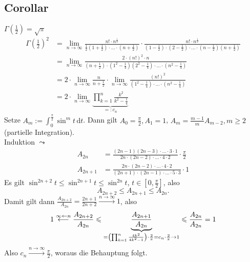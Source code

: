 \subsection[Corollar: $\Gamma(1/2) = \sqrt{\pi}$]{Corollar} %
\label{sub:79}
$\Gamma(\frac{1}{2} ) = \sqrt{\pi }  $
\begin{align*}
	\Gamma(\frac{1}{2} )^2 &= \lim_{ n \to \infty} \frac{n! \cdot n^{\frac{1}{2} }}{\frac{1}{2}(1+ \frac{1}{2} ) \cdot \ldots \cdot (n+ \frac{1}{2} ) } \cdot 
	\frac{n! \cdot n^{\frac{1}{2}} }{(1-\frac{1}{2} ) \cdot (2-\frac{1}{2} ) \cdot \ldots \cdot (n- \frac{1}{2} ) (n+\frac{1}{2} )}  \\
	&= \lim_{ n \to \infty} \frac{2 \cdot  (n!)^2 \cdot n}{(n+\frac{1}{2} ) \cdot (1^2- \frac{1}{4} ) (2^2 - \frac{1}{4} ) \cdot \ldots \cdot (n^2- \frac{1}{4} )} \\
	&= 2 \cdot \lim_{ n \to \infty}  \frac{n}{n+\frac{1}{2} } \cdot \lim_{ n \to \infty} \frac{(n!)^2}{(1^2 - \frac{1}{4} ) \cdot \ldots \cdot (n^2- \frac{1}{4} )} \\
	&= 2 \cdot \lim_{ n \to \infty} \underbrace{\prod_{k=1}^{n} \frac{k^2}{k^2- \frac{1}{4} } }_{=: c_n}
\end{align*}
Setze $A_m := \int_{0} ^{\frac{\pi }{2} } \! \sin^m t  \, \mathrm{d}t$. Dann gilt $A_0 = \frac{\pi }{2}, A_1 =1 $, $A_m = \frac{m-1}{m} A_{m-2}, m \ge 2 $ 
(partielle Integration). \\
Induktion $\leadsto$
\begin{align*}
	A_{2n} &= \frac{(2n-1) (2n-3) \cdot \ldots \cdot 3 \cdot 1}{2n \cdot (2n-2) \cdot \ldots \cdot 4 \cdot 2} \cdot \frac{\pi}{2} \\
	A_{2n+1} &= \frac{2n \cdot (2n-2) \cdot \ldots \cdot 4 \cdot 2}{(2n+1) \cdot (2n-1) \cdot \ldots \cdot 5 \cdot 3} \cdot 1 
\end{align*}
Es gilt $\sin^{2n+2}t \le \sin^{2n+1} t \le \sin^{2n} t $, $t \in [0, \frac{\pi}{2}]$, also
\[
	A_{2n+2} \le A_{2n+1} \le A_{2n}.
\]
Damit gilt dann $\frac{A_{2n+2}}{A_{2n}} = \frac{2n+1}{2n+2} \xrightarrow{n \to \infty} 1  $, also
\begin{align*}
	1\overset{\infty \leftarrow n}{\longleftarrow} \frac{A_{2n+2}}{A_{2n}} \le \underbrace{\frac{A_{2n+1}}{A_{2n}}}_{= \enbrace*{\prod_{k=1}^n \frac{4k^2}{4k^2-1}} \cdot \frac{2}{\pi} = c_n \cdot \frac{2}{\pi} \to 1  } \le \frac{A_{2n}}{A_{2n}} = 1  
\end{align*}
Also $c_n \xrightarrow{n \to \infty} \frac{\pi }{2} $, woraus die Behauptung folgt. \bewende

